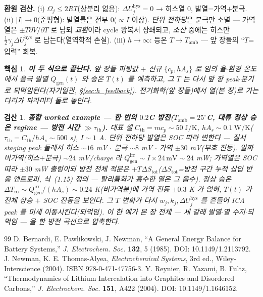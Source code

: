 \documentclass[11pt,a4paper]{article}
\newtheorem*{keybox}{핵심}
\newtheorem*{verifybox}{검산}
\newcommand{\hys}{\mathrm{hys}}
\newcommand{\irr}{\mathrm{irr}}
\newcommand{\gen}{\mathrm{gen}}
\newcommand{\amb}{\mathrm{amb}}
\newcommand{\Th}{\mathrm{th}}
\begin{document}
\textbf{환원 검산.} (i) $\Omega_j\le2RT$(상분리 없음): $\Delta U_j^\hys=0$ → 히스열 $0$, 발열=가역$+$분극. (ii)
$|I|\to0$(준평형): 발열률은 전부 $0$($\propto I$ 이상). \emph{단위 전하당}은 분극만 소멸 — 가역열은
$\pm T\partial V/\partial T$ 로 남되 \emph{교환}이라 cycle 왕복서 상쇄되고, \emph{소산} 중에는 히스만
$\tfrac12\gamma_j\Delta U_j^\hys$ 로 남는다(열역학적 손실). (iii) $h\to\infty$: 등온 $T\to T_\amb$ — 앞 장들의 ``$T$=입력'' 회복.
\begin{keybox}
\textbf{이 두 식으로 끝난다.} 앞 장들 피팅값 $+$ 신규 $\{c_p,hA_s\}$ 로 임의 율$\cdot$환경 온도에서 음극
발열 $Q_\gen(t)$ 와 승온 $T(t)$ 를 예측하고, 그 $T$ 는 다시 앞 장 peak$\cdot$분기로 되먹임된다(자기일관,
\S\ref{sec:h_feedback}). 전기화학(앞 장들)에서 열(본 장)로 가는 다리가 파라미터 \emph{둘}로 놓인다.
\end{keybox}
\begin{verifybox}
\textbf{종합 worked example — 한 번의 $0.2$C 방전($T_\amb=25^\circ$C, 대류 정상 승온 regime — 방전 시간
$\gg\tau_\Th$).} 대표 셀 $C_\Th=mc_p\sim50\
\mathrm{J/K}$, $hA_s\sim0.1\ \mathrm{W/K}$($\tau_\Th=C_\Th/hA_s\sim500$ s), $I\sim1$ A. 단위 전하당 발열은 SOC
따라 변한다 — 질서 staging peak 둘레서 히스 $\sim16$ mV $\cdot$ 분극 $\sim8$ mV $\cdot$ 가역 $\pm30$ mV(부호 진동).
알짜 비가역(히스$+$분극) $\sim24$ mV/charge 라 $Q_\gen^\irr\sim I\!\times\!24\,\mathrm{mV}\sim24$ mW; 가역열은 SOC
따라 $\pm30$ mW 출렁이되 방전 전체 적분은 $+T\Delta S_\mathrm{tot}$($\Delta S_\mathrm{tot}$=방전 구간 누적 \emph{삽입}
반응 엔트로피, 식~(1.15) 정의 — 탈리튬화가 흡수한 열은 그 음수). 정상 승온 $\Delta T_\infty\sim Q_\gen^\irr/(hA_s)
\sim0.24$ K(비가역분)에 가역 진동 $\pm0.3$ K 가 얹혀, $T(t)$ 가 \emph{전체 상승 $+$ SOC 진동}을 보인다. 그 $T$
변화가 다시 $w_j,k_j,\Delta U_j^\hys$ 를 흔들어 ICA peak 를 미세 이동시킨다(되먹임). \emph{이 한 예가 본 장 전체 —
세 갈래 발열$\cdot$열 수지$\cdot$되먹임 — 을 한 방전 곡선으로 압축한다}.
\end{verifybox}

\begin{thebibliography}{99}
 D. Bernardi, E. Pawlikowski, J. Newman, ``A General Energy Balance for Battery Systems,'' \emph{J. Electrochem. Soc.} \textbf{132}, 5 (1985). DOI: 10.1149/1.2113792.
\bibitem{newman2004} J. Newman, K. E. Thomas-Alyea, \emph{Electrochemical Systems}, 3rd ed., Wiley-Interscience (2004). ISBN 978-0-471-47756-3.
\bibitem{reynier2004} Y. Reynier, R. Yazami, B. Fultz, ``Thermodynamics of Lithium Intercalation into Graphites and Disordered Carbons,'' \emph{J. Electrochem. Soc.} \textbf{151}, A422 (2004). DOI: 10.1149/1.1646152.
\end{thebibliography}
\end{document}
